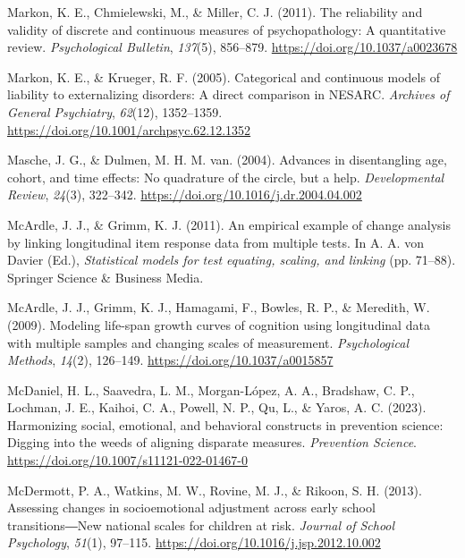 \documentclass[
  american,
  letterpaper,
  12pt]{article}
\newlength{\cslhangindent}
\newenvironment{CSLReferences}[2] %
 {\begin{list}{}{%
  \setlength{\itemindent}{0pt}
  \setlength{\leftmargin}{0pt}
  \setlength{\parsep}{0pt}
  \ifodd #1
   \setlength{\leftmargin}{\cslhangindent}
   \setlength{\itemindent}{-1\cslhangindent}
  \fi
  \setlength{\itemsep}{#2\baselineskip}}}
 {\end{list}}
\begin{document}
\begin{CSLReferences}{1}{0}
Markon, K. E., Chmielewski, M., \& Miller, C. J. (2011). The reliability
and validity of discrete and continuous measures of psychopathology: {A}
quantitative review. \emph{Psychological Bulletin}, \emph{137}(5),
856--879. \url{https://doi.org/10.1037/a0023678}

Markon, K. E., \& Krueger, R. F. (2005). Categorical and continuous
models of liability to externalizing disorders: {A} direct comparison in
{NESARC}. \emph{Archives of General Psychiatry}, \emph{62}(12),
1352--1359. \url{https://doi.org/10.1001/archpsyc.62.12.1352}

Masche, J. G., \& Dulmen, M. H. M. van. (2004). Advances in
disentangling age, cohort, and time effects: {No} quadrature of the
circle, but a help. \emph{Developmental Review}, \emph{24}(3), 322--342.
\url{https://doi.org/10.1016/j.dr.2004.04.002}

McArdle, J. J., \& Grimm, K. J. (2011). An empirical example of change
analysis by linking longitudinal item response data from multiple tests.
In A. A. von Davier (Ed.), \emph{Statistical models for test equating,
scaling, and linking} (pp. 71--88). Springer Science \& Business Media.

McArdle, J. J., Grimm, K. J., Hamagami, F., Bowles, R. P., \& Meredith,
W. (2009). Modeling life-span growth curves of cognition using
longitudinal data with multiple samples and changing scales of
measurement. \emph{Psychological Methods}, \emph{14}(2), 126--149.
\url{https://doi.org/10.1037/a0015857}

McDaniel, H. L., Saavedra, L. M., Morgan-López, A. A., Bradshaw, C. P.,
Lochman, J. E., Kaihoi, C. A., Powell, N. P., Qu, L., \& Yaros, A. C.
(2023). Harmonizing social, emotional, and behavioral constructs in
prevention science: {Digging} into the weeds of aligning disparate
measures. \emph{Prevention Science}.
\url{https://doi.org/10.1007/s11121-022-01467-0}

McDermott, P. A., Watkins, M. W., Rovine, M. J., \& Rikoon, S. H.
(2013). Assessing changes in socioemotional adjustment across early
school transitions―{New} national scales for children at risk.
\emph{Journal of School Psychology}, \emph{51}(1), 97--115.
\url{https://doi.org/10.1016/j.jsp.2012.10.002}


\end{CSLReferences}
\end{document}
